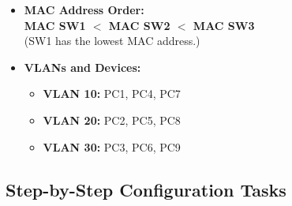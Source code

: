\documentclass[a4paper]{book}
\begin{document}
\begin{itemize}
	\item \textbf{MAC Address Order:} \\
	      \textbf{MAC SW1 $<$ MAC SW2 $<$ MAC SW3} \\
	      (SW1 has the lowest MAC address.)

	\item \textbf{VLANs and Devices:}
	      \begin{itemize}
		      \item \textbf{VLAN 10:} PC1, PC4, PC7
		      \item \textbf{VLAN 20:} PC2, PC5, PC8
		      \item \textbf{VLAN 30:} PC3, PC6, PC9
	      \end{itemize}
\end{itemize}
\newpage
\subsection*{Step-by-Step Configuration Tasks}
\end{document}
